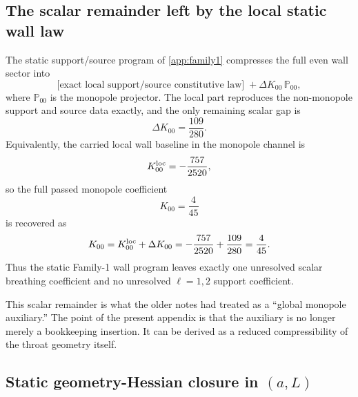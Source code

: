 \documentclass[11pt]{article}
\begin{document}
\subsection{The scalar remainder left by the local static wall law}
\label{app:geom-breathing-static-gap}

The static support/source program of \cref{app:family1} compresses the full even wall
sector into
\begin{equation}
\text{[exact local support/source constitutive law]}
\;+
\Delta K_{00}\,\mathbb P_{00},
\label{eq:geom-breathing-local-plus-mono}
\end{equation}
where \(\mathbb P_{00}\) is the monopole projector.
The local part reproduces the non-monopole support and source data exactly, and the only
remaining scalar gap is
\begin{equation}
\Delta K_{00}=\frac{109}{280}.
\label{eq:geom-breathing-109-280}
\end{equation}
Equivalently, the carried local wall baseline in the monopole channel is
\begin{equation}
K_{00}^{\rm loc}=-\frac{757}{2520},
\label{eq:geom-breathing-K00loc}
\end{equation}
so the full passed monopole coefficient
\begin{equation}
K_{00}=\frac{4}{45}
\label{eq:geom-breathing-K00target}
\end{equation}
is recovered as
\begin{equation}
K_{00}=K_{00}^{\rm loc}+\Delta K_{00}
=-\frac{757}{2520}+\frac{109}{280}
=\frac{4}{45}.
\label{eq:geom-breathing-K00-split}
\end{equation}
Thus the static Family-1 wall program leaves exactly one unresolved scalar breathing
coefficient and no unresolved \(\ell=1,2\) support coefficient.

This scalar remainder is what the older notes had treated as a ``global monopole
auxiliary.''
The point of the present appendix is that the auxiliary is no longer merely a bookkeeping
insertion.
It can be derived as a reduced compressibility of the throat geometry itself.

\subsection{Static geometry-Hessian closure in \texorpdfstring{$(a,L)$}{(a,L)}}
\label{app:geom-breathing-static-hessian}
\end{document}
